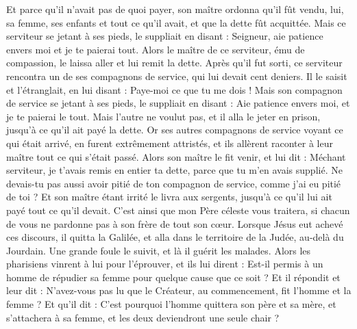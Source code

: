 \begin{multicols}{2}
Et parce qu'il n'avait pas de quoi payer, son maître ordonna qu'il fût vendu, lui, sa femme, ses enfants et tout ce qu'il avait, et que la dette fût acquittée.
Mais ce serviteur se jetant à ses pieds, le suppliait en disant : Seigneur, aie patience envers moi et je te paierai tout.
Alors le maître de ce serviteur, ému de compassion, le laissa aller et lui remit la dette.
Après qu’il fut sorti, ce serviteur rencontra un de ses compagnons de service, qui lui devait cent deniers. Il le saisit et l'étranglait, en lui disant : Paye-moi ce que tu me dois !
Mais son compagnon de service se jetant à ses pieds, le suppliait en disant : Aie patience envers moi, et je te paierai le tout.
Mais l’autre ne voulut pas, et il alla le jeter en prison, jusqu'à ce qu'il ait payé la dette.
Or ses autres compagnons de service voyant ce qui était arrivé, en furent extrêmement attristés, et ils allèrent raconter à leur maître tout ce qui s'était passé.
Alors son maître le fit venir, et lui dit : Méchant serviteur, je t’avais remis en entier ta dette, parce que tu m'en avais supplié.
Ne devais-tu pas aussi avoir pitié de ton compagnon de service, comme j’ai eu pitié de toi ?
Et son maître étant irrité le livra aux sergents, jusqu'à ce qu'il lui ait payé tout ce qu’il devait.
C'est ainsi que mon Père céleste vous traitera, si chacun de vous ne pardonne pas à son frère de tout son cœur.
\VerseOne{}Lorsque Jésus eut achevé ces discours, il quitta la Galilée, et alla dans le territoire de la Judée, au-delà du Jourdain.
Une grande foule le suivit, et là il guérit les malades.
Alors les pharisiens vinrent à lui pour l'éprouver, et ils lui dirent : Est-il permis à un homme de répudier sa femme pour quelque cause que ce soit ?
Et il répondit et leur dit : N'avez-vous pas lu que le Créateur, au commencement, fit l’homme et la femme ?
Et qu'il dit : C’est pourquoi l'homme quittera son père et sa mère, et s’attachera à sa femme, et les deux deviendront une seule chair ?

\end{multicols}
